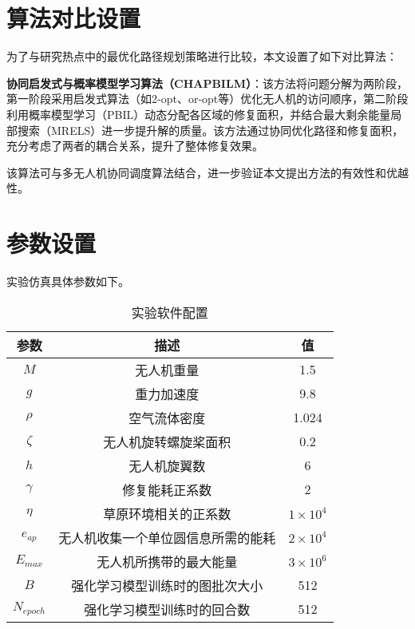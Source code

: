 \documentclass[AutoFakeBold]{LZUThesis}
\begin{document}
\section{算法对比设置}

为了与研究热点中的最优化路径规划策略\cite{aggarwal2020path}进行比较，本文设置了如下对比算法：

\textbf{协同启发式与概率模型学习算法（CHAPBILM）\cite{JIAO2024108084}}：该方法将问题分解为两阶段，第一阶段采用启发式算法（如2-opt、or-opt等）优化无人机的访问顺序，第二阶段利用概率模型学习（PBIL）动态分配各区域的修复面积，并结合最大剩余能量局部搜索（MRELS）进一步提升解的质量。该方法通过协同优化路径和修复面积，充分考虑了两者的耦合关系，提升了整体修复效果。

该算法可与多无人机协同调度算法结合，进一步验证本文提出方法的有效性和优越性。
\section{参数设置}
实验仿真具体参数如下。

\label{sub:无人机参数表格}
\begin{table}[H]
	\centering
	\caption{实验软件配置}
	\setlength{\tabcolsep}{18pt} %
	\begin{tabular}{ccc} %
		\toprule
		参数              & 描述                & 值                   \\
		\midrule
		\( M \)         & 无人机重量             & 1.5                 \\
		\( g \)         & 重力加速度             & 9.8                 \\
		\( \rho \)      & 空气流体密度            & 1.024               \\
		\( \zeta \)     & 无人机旋转螺旋桨面积        & 0.2                 \\
		\( h \)         & 无人机旋翼数            & 6                   \\
		\( \gamma \)    & 修复能耗正系数           & 2                   \\
		\( \eta \)      & 草原环境相关的正系数        & \( 1 \times 10^4 \) \\
		\( e_{ap} \)    & 无人机收集一个单位圆信息所需的能耗 & \( 2 \times 10^4 \) \\
		\( E_{max} \)   & 无人机所携带的最大能量       & \( 3 \times 10^6 \) \\
		\( B \)         & 强化学习模型训练时的图批次大小   & 512                 \\
		\( N_{epoch} \) & 强化学习模型训练时的回合数     & 512                 \\
		\bottomrule
	\end{tabular}
	\label{tbl_drone_parameters}
\end{table}
\end{document}
